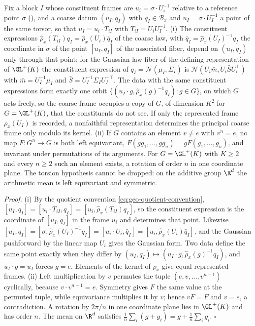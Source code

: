 Fix a block $I$ whose constituent frames are $u_i=\sigma\cdot U_i^{-1}$ relative to a reference point
$\sigma$ (), and a coarse datum $(u_I,q_I)$ with $q_I\in\mathcal B_x$ and
$u_I=\sigma\cdot U_I^{-1}$ a point of the same torsor, so that $u_I=u_i\cdot T_{iI}$ with
$T_{iI}=U_iU_I^{-1}$. (i) The constituent expressions
$\widehat\rho_x(T_{iI})q_I=\widehat\rho_x(U_i)\bar q_I$ of the coarse law, with
$\bar q_I=\widehat\rho_x(U_I)^{-1}q_I$ the coordinate in $\sigma$ of the point $[u_I,q_I]$ of the associated
fiber, depend on $(u_I,q_I)$ only through that point; for the Gaussian law fiber of the defining
representation of $\GL^+(K)$ the constituent expression of $q_I=\mathcal N(\mu_I,\Sigma_I)$ is
$\mathcal N(U_i\bar m,U_i\bar SU_i^\top)$ with $\bar m=U_I^{-1}\mu_I$ and $\bar S=U_I^{-1}\Sigma_IU_I^{-\top}$.
The data with the same constituent expressions form exactly one orbit
$\{(u_I\cdot g,\widehat\rho_x(g)^{-1}q_I):g\in G\}$, on which $G$ acts freely, so the coarse frame occupies a
copy of $G$, of dimension $K^2$ for $G=\GL^+(K)$, that the constituents do not see. If only the represented
frame $\rho_x(U_I)$ is recorded, a nonfaithful representation determines the principal coarse frame only
modulo its kernel. (ii) If $G$ contains an element $v\neq e$ with $v^n=e$, no map $F:G^n\to G$ is both left
equivariant, $F(gg_1,\ldots,gg_n)=gF(g_1,\ldots,g_n)$, and invariant under permutations of its arguments. For
$G=\GL^+(K)$ with $K\geq2$ and every $n\geq2$ such an element exists, a rotation of order $n$ in one
coordinate plane. The torsion hypothesis cannot be dropped: on the additive group $\R^d$ the arithmetic
mean is left equivariant and symmetric. 

\noindent\emph{Proof.}
(i) By the quotient convention \eqref{eq:geo-quotient-convention},
$[u_I,q_I]=[u_i\cdot T_{iI},q_I]=[u_i,\widehat\rho_x(T_{iI})q_I]$, so the constituent expression is the
coordinate of $[u_I,q_I]$ in the frame $u_i$ and determines that point. Likewise
$[u_I,q_I]=[\sigma,\widehat\rho_x(U_I)^{-1}q_I]=[u_i\cdot U_i,\bar q_I]=[u_i,\widehat\rho_x(U_i)\bar q_I]$, and
the Gaussian pushforward by the linear map $U_i$ gives the Gaussian form. Two data define the same
point exactly when they differ by $(u_I,q_I)\mapsto(u_I\cdot g,\widehat\rho_x(g)^{-1}q_I)$, and
$u_I\cdot g=u_I$ forces $g=e$. Elements of the kernel of $\rho_x$ give equal represented frames. (ii) Left
multiplication by $v$ permutes the tuple $(e,v,\ldots,v^{n-1})$ cyclically, because $v\cdot v^{n-1}=e$.
Symmetry gives $F$ the same value at the permuted tuple, while equivariance multiplies it by $v$; hence
$vF=F$ and $v=e$, a contradiction. A rotation by $2\pi/n$ in one coordinate plane lies in $\GL^+(K)$ and has
order $n$. The mean on $\R^d$ satisfies $\tfrac1n\sum_i(g+g_i)=g+\tfrac1n\sum_ig_i$. $\square$

